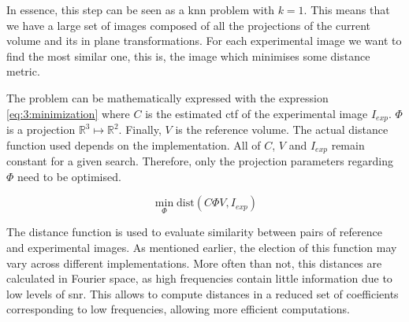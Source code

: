 \documentclass[../main.tex]{subfiles}
\begin{document}
In essence, this step can be seen as a \gls{knn} problem with $k=1$. This means that we have a large set of images composed of all the projections of the current volume and its in plane transformations. For each experimental image we want to find the most similar one, this is, the image which minimises some distance metric.

The problem can be mathematically expressed with the expression \eqref{eq:3:minimization} where $C$ is the estimated \gls{ctf} of the experimental image $I_{exp}$. $\Phi$ is a projection $\mathbb{R}^3 \mapsto \mathbb{R}^2$. Finally, $V$ is the reference volume. The actual distance function used depends on the implementation. All of $C$, $V$ and $I_{exp}$ remain constant for a given search. Therefore, only the projection parameters regarding $\Phi$ need to be optimised.

\begin{equation}\label{eq:3:minimization}
    \min_\Phi \text{dist}(C\Phi V, I_{exp})
\end{equation}

The distance function is used to evaluate similarity between pairs of reference and experimental images. As mentioned earlier, the election of this function may vary across different implementations. More often than not, this distances are calculated in Fourier space, as high frequencies contain little information due to low levels of \gls{snr}. This allows to compute distances in a reduced set of coefficients corresponding to low frequencies, allowing more efficient computations.
\end{document}
